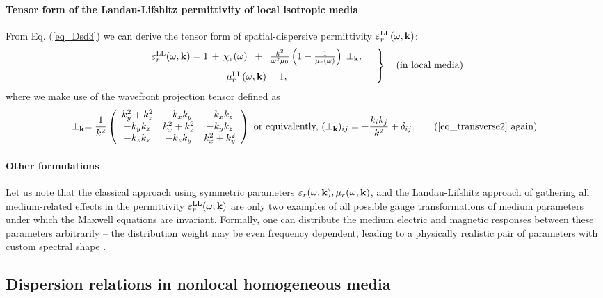 \paragraph{Tensor form of the Landau-Lifshitz permittivity of local isotropic media}%
From Eq. (\ref{eq_Dsd3}) we can derive the tensor form of spatial-dispersive permittivity $\varepsilon_r^\text{LL}(\omega,{\mathbf{k}})$:
\begin{equation} 
\left.  \begin{array}{c}
\epsLL(\omega,\kk) = 1 \,+\, \chi_e(\omega) \;\;+\;\; \frac{k^2}{\omega^2 \mu_0}\left(1 - \frac{1}{\murl(\omega)}\right) \, \TT, \medskip \\
\muLL(\omega,\kk) = 1, 
\end{array} \quad \right\} \quad \text{(in local media)}
\label{eq_epsmusd3} \end{equation} 
where we make use of the wavefront projection tensor defined as
\begin{equation} \TT = \frac{1}{k^2} 
\left(\begin{array}{ccc} 
	k_y^2+k_z^2		& -k_x k_y		& -k_x k_z \\ 
	-k_y k_x		& k_x^2+k_z^2	& -k_y k_z \\ 
	-k_z k_x		& -k_z k_y		& k_x^2+k_y^2
	\end{array} \right) 
\text{ or equivalently, }
(\TT)_{ij} = - \frac{k_i k_j}{k^2} + \delta_{ij} . \tag{\ref{eq_transverse2} \again} \end{equation}

\paragraph{Other formulations}%
Let us note that the classical approach using symmetric parameters $\varepsilon_r(\omega,{\mathbf{k}}),\mu_r(\omega,{\mathbf{k}})$, and the Landau-Lifshitz approach of gathering all medium-related effects in the permittivity $\varepsilon_r^\text{LL}(\omega,{\mathbf{k}})$ are only two examples of all possible gauge transformations of medium parameters under which the Maxwell equations are invariant. 
Formally, one can distribute the medium electric and magnetic responses between these parameters arbitrarily -- the distribution weight may be even frequency dependent, leading to a physically realistic pair of parameters with custom spectral shape \cite{skaar2014diamagnetism}.

\subsection{Dispersion relations in nonlocal homogeneous media} 

